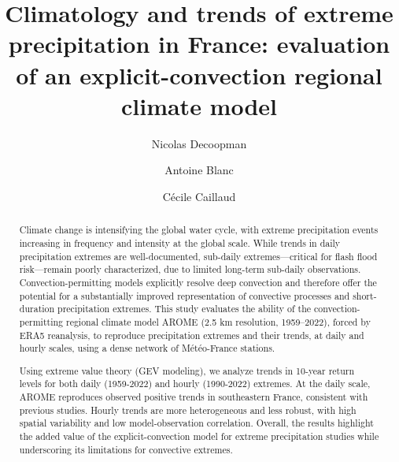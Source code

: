 \documentclass[hess, manuscript]{copernicus}
\begin{document}
\title{Climatology and trends of extreme precipitation in France: evaluation of an explicit-convection regional climate model}
\author[1]{Nicolas Decoopman}
\author[2]{Antoine Blanc}
\author[3]{Cécile Caillaud}




\maketitle


\begin{abstract}Climate change is intensifying the global water cycle, with extreme precipitation events increasing in frequency and intensity at the global scale. While trends in daily precipitation extremes are well-documented, sub-daily extremes---critical for flash flood risk---remain poorly characterized, due to limited long-term sub-daily observations. Convection-permitting models explicitly resolve deep convection and therefore offer the potential for a substantially improved representation of convective processes and short-duration precipitation extremes. This study evaluates the ability of the convection-permitting regional climate model AROME (2.5 km resolution, 1959--2022), forced by ERA5 reanalysis, to reproduce precipitation extremes and their trends, at daily and hourly scales, using a dense network of Météo-France stations.

Using extreme value theory (GEV modeling), we analyze trends in 10-year return levels for both daily (1959-2022) and hourly (1990-2022) extremes. At the daily scale, AROME reproduces observed positive trends in southeastern France, consistent with previous studies. Hourly trends are more heterogeneous and less robust, with high spatial variability and low model-observation correlation. Overall, the results highlight the added value of the explicit-convection model for extreme precipitation studies while underscoring its limitations for convective extremes.
\end{abstract}
\end{document}

